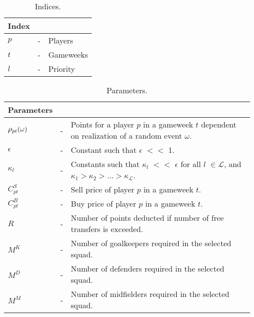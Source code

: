 \begin{table}[H]
\centering
\caption{Indices.}
\begin{tabular}{@{}lll@{}}
\toprule
Index &   &           \\ \midrule
$p$   & - & Players   \\
$t$   & - & Gameweeks \\
$l$   & - & Priority  \\ \bottomrule
\end{tabular}
\end{table}


\begin{table}[H]
\tabcolsep=0.11cm
\centering
\caption{Parameters.}
\begin{tabular}{@{}lll@{}}
\toprule
Parameters                       &   &                                                                                                \\ \midrule
$\mathlarger{\rho_{pt}(\omega)}$ & - & Points for a player $p$ in a gameweek $t$ dependent on realization of a random event $\omega$. \\
$\epsilon$                       & - & Constant such that $\epsilon$ $<<$ 1.                                                                     \\
$\kappa_{l}$                     & - & Constants such that $\kappa_{l}$ $<<$ $\epsilon$ for all $l$ $\in \mathcal{L}$, and $\kappa_{1} > \kappa_{2} > \ldots > \kappa_{\mathcal{L}}$.                                               \\
$C_{pt}^{S}$                     & - & Sell price of player $p$ in a gameweek $t$.                                                    \\
$C_{pt}^{B}$                     & - & Buy price of player $p$ in a gameweek $t$.                                                     \\
$R$                              & - & Number of points deducted if number of free transfers is exceeded.        \\
$M^{K}$                          & - & Number of goalkeepers required in the selected squad.                                           \\
$M^{D}$                          & - & Number of defenders required in the selected squad.                                             \\
$M^{M}$                          & - & Number of midfielders required in the selected squad.                                           \\

\end{tabular}
\end{table}
